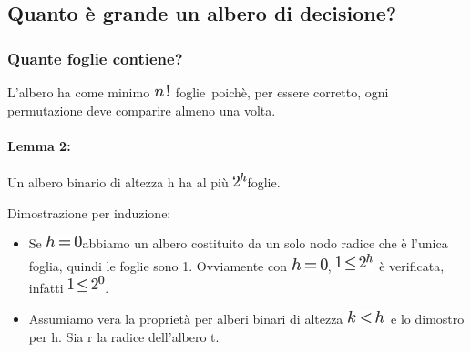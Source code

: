 \documentclass{article}
\providecommand{\tightlist}{%
  \setlength{\itemsep}{0pt}\setlength{\parskip}{0pt}}
\let\oldparagraph\paragraph
\renewcommand{\paragraph}[1]{\oldparagraph{#1}\mbox{}}
\begin{document}
\hypertarget{h.prflgx3s7s1g}{\subsection{\texorpdfstring{{Quanto è
grande un albero di
decisione?}}{Quanto è grande un albero di decisione?}}\label{h.prflgx3s7s1g}}

\hypertarget{h.cphw2k3mqktf}{\subsubsection{\texorpdfstring{{Quante
foglie contiene?}}{Quante foglie contiene?}}\label{h.cphw2k3mqktf}}

{L'albero ha come minimo
}\includegraphics{images/image160.png}{~foglie}{~poichè, per essere
corretto, ogni permutazione deve comparire almeno una volta.}

\hypertarget{h.yiy1tipj4aof}{\paragraph{\texorpdfstring{{Lemma
2:}}{Lemma 2:}}\label{h.yiy1tipj4aof}}

{Un albero binario di altezza h ha al più
}\includegraphics{images/image161.png}{foglie.}

{}

{Dimostrazione per induzione:}

\begin{itemize}
\tightlist
\item
  {Se }\includegraphics{images/image162.png}{abbiamo un albero
  costituito da un solo nodo radice che è l'unica foglia, quindi le
  foglie sono 1. Ovviamente con }\includegraphics{images/image162.png}{,
  }\includegraphics{images/image163.png}{~è verificata, infatti
  }\includegraphics{images/image164.png}{.}
\item
  {Assumiamo vera la proprietà per alberi binari di altezza
  }\includegraphics{images/image165.png}{~e lo dimostro per h. Sia r la
  radice dell'albero t. }
\end{itemize}
\end{document}
